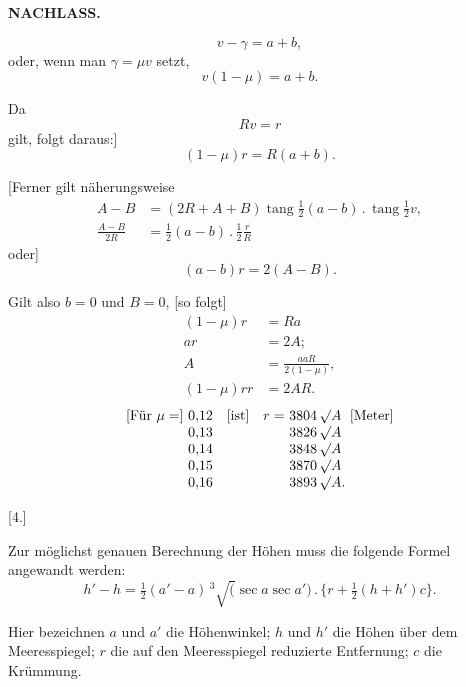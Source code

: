 \par\clearpage
\noindent{}\hfill{\small\textbf{NACHLASS.}}\hfill\null\par\medskip
\begingroup
\setlength{\abovedisplayskip}{5pt}\setlength{\belowdisplayskip}{5pt}
\[
v-\gamma=a+b,
\]
\noindent oder, wenn man \(\gamma=\mu v\) setzt,
\[
v(1-\mu)=a+b.
\]
\par\noindent\hspace*{\parindent}Da
\[
Rv=r
\]
\noindent gilt, folgt daraus:]
\[
(1-\mu)r=R(a+b).
\]
\par\noindent\hspace*{\parindent}[Ferner gilt näherungsweise
\[
\begin{aligned}
A-B&=(2R+A+B)\operatorname{tang}\tfrac12(a-b)\mathbin{.}\operatorname{tang}\tfrac12v,\\
\tfrac{A-B}{2R}&=\tfrac12(a-b)\mathbin{.}\tfrac12\tfrac rR
\end{aligned}
\]
\noindent oder]
\[
(a-b)r=2(A-B).
\]
\par\noindent\hspace*{\parindent}Gilt also \(b=0\) und \(B=0\), [so folgt]
\[
\begin{aligned}
(1-\mu)r&=Ra\\
ar&=2A;\\
A&=\tfrac{aaR}{2(1-\mu)},\\
(1-\mu)rr&=2AR.
\end{aligned}
\]
\[
\begin{array}{@{}r@{\ }l@{\quad}l@{\quad}r@{\ }l@{\ }l@{}}
\text{[Für }\mu=] & 0{,}12 & \text{[ist]} & r= & 3804\,\surd A & \text{[Meter]}\\
 &0{,}13&&&3826\,\surd A&\\
 &0{,}14&&&3848\,\surd A&\\
 &0{,}15&&&3870\,\surd A&\\
 &0{,}16&&&3893\,\surd A.&
\end{array}
\]
\par\medskip
\begin{center}
[4.]\par{}
\end{center}
\par\noindent\hspace*{\parindent}Zur möglichst genauen Berechnung der Höhen muss die folgende Formel angewandt werden:
\[
h'-h=\tfrac12(a'-a)\,{}^3\!\surd(\sec a\sec a')\mathbin{.}\{r+\tfrac12(h+h')c\}.
\]
\par\noindent\hspace*{\parindent}Hier bezeichnen \(a\) und \(a'\) die Höhenwinkel; \(h\) und \(h'\) die Höhen über dem
Meeresspiegel; \(r\) die auf den Meeresspiegel reduzierte Entfernung; \(c\) die Krümmung.
\endgroup


